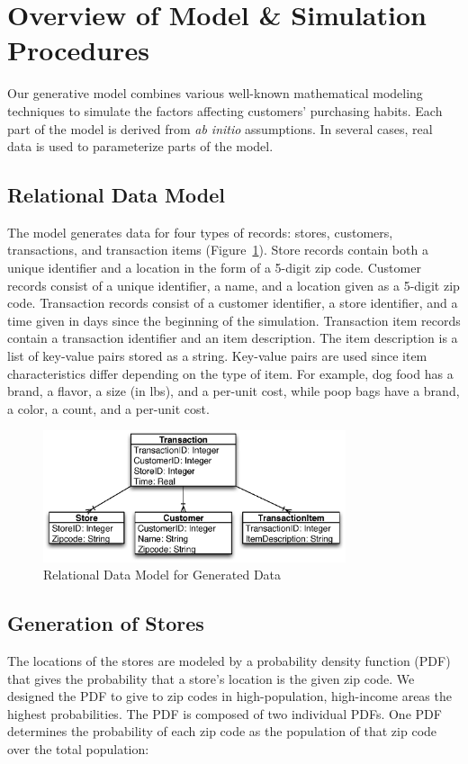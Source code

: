 \documentclass[conference]{IEEEtran}
\begin{document}
\section{Overview of Model \& Simulation Procedures}
Our generative model combines various well-known mathematical modeling techniques to simulate the factors affecting customers' purchasing habits.  Each part of the model is derived from \emph{ab initio} assumptions.  In several cases, real data is used to parameterize parts of the model. 

\subsection{Relational Data Model}
The model generates data for four types of records: stores, customers, transactions, and transaction items (Figure~\ref{fig:relational-data-model}).  Store records contain both a unique identifier and a location in the form of a 5-digit zip code. Customer records consist of a unique identifier, a name, and a location given as a 5-digit zip code. Transaction records consist of a customer identifier, a store identifier, and a time given in days since the beginning of the simulation. Transaction item records contain a transaction identifier and an item description.  The item description is a list of key-value pairs stored as a string.  Key-value pairs are used since item characteristics differ depending on the type of item.  For example, dog food has a brand, a flavor, a size (in lbs), and a per-unit cost, while poop bags have a brand, a color, a count, and a per-unit cost.

\begin{figure}[!t]
  \centering
  \includegraphics[width=3.5in]{figures/transactions_data_model.eps}
  \caption{Relational Data Model for Generated Data}
  \label{fig:relational-data-model}
\end{figure}

\subsection{Generation of Stores}
The locations of the stores are modeled by a probability density function (PDF) that gives the probability that a store's location is the given zip code. We designed the PDF to give to zip codes in high-population, high-income areas the highest probabilities. The PDF is composed of two individual PDFs. One PDF determines the probability of each zip code as the population of that zip code over the total population:
\end{document}
